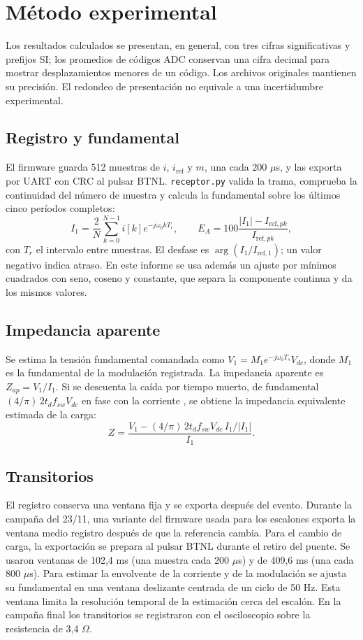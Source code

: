 \documentclass[conference]{IEEEtran}
\begin{document}
\section{Método experimental}
Los resultados calculados se presentan, en general, con tres cifras significativas y prefijos SI; los promedios de códigos ADC conservan una cifra decimal para mostrar desplazamientos menores de un código. Los archivos originales mantienen su precisión. El redondeo de presentación no equivale a una incertidumbre experimental.

\subsection{Registro y fundamental}
El firmware guarda 512 muestras de $i$, $i_{\mathrm{ref}}$ y $m$, una cada 200 $\mu$s, y las exporta por UART con CRC al pulsar BTNL. \texttt{receptor.py} valida la trama, comprueba la continuidad del número de muestra y calcula la fundamental sobre los últimos cinco períodos completos:
\begin{equation}
I_1=\frac{2}{N}\sum_{k=0}^{N-1}i[k]e^{-j\omega_0kT_r},\qquad E_A=100\frac{|I_1|-I_{\mathrm{ref},pk}}{I_{\mathrm{ref},pk}},
\end{equation}
con $T_r$ el intervalo entre muestras. El desfase es $\arg(I_1/I_{\mathrm{ref},1})$; un valor negativo indica atraso. En este informe se usa además un ajuste por mínimos cuadrados con seno, coseno y constante, que separa la componente continua y da los mismos valores.

\subsection{Impedancia aparente}
Se estima la tensión fundamental comandada como $V_1=M_1e^{-j\omega_0T_s}V_{dc}$, donde $M_1$ es la fundamental de la modulación registrada. La impedancia aparente es $Z_{ap}=V_1/I_1$. Si se descuenta la caída por tiempo muerto, de fundamental $(4/\pi)\,2t_df_{sw}V_{dc}$ en fase con la corriente \cite{mohan}, se obtiene la impedancia equivalente estimada de la carga:
\begin{equation}
Z=\frac{V_1-(4/\pi)\,2t_df_{sw}V_{dc}\,I_1/|I_1|}{I_1}.
\end{equation}

\subsection{Transitorios}
El registro conserva una ventana fija y se exporta después del evento. Durante la campaña del 23/11, una variante del firmware usada para los escalones exporta la ventana medio registro después de que la referencia cambia. Para el cambio de carga, la exportación se prepara al pulsar BTNL durante el retiro del puente. Se usaron ventanas de 102,4 ms (una muestra cada 200 $\mu$s) y de 409,6 ms (una cada 800 $\mu$s). Para estimar la envolvente de la corriente y de la modulación se ajusta su fundamental en una ventana deslizante centrada de un ciclo de 50 Hz. Esta ventana limita la resolución temporal de la estimación cerca del escalón. En la campaña final los transitorios se registraron con el osciloscopio sobre la resistencia de 3,4 $\Omega$.
\end{document}
